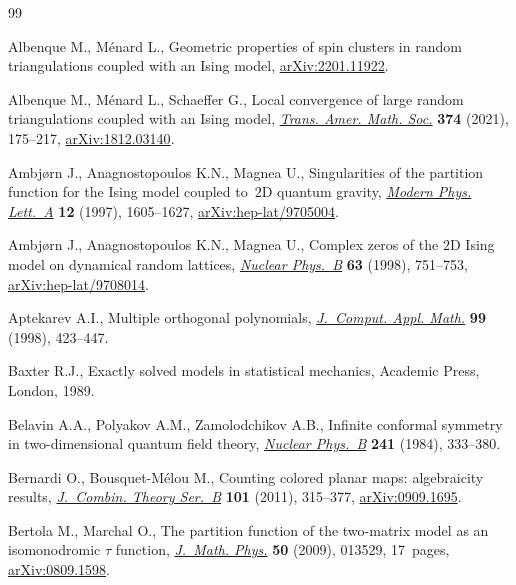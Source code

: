 \documentclass[pdftex]{sigma}
\numberwithin{equation}{section}
\begin{document}
\begin{thebibliography}{99}
\footnotesize\itemsep=0pt

Albenque M., M\'enard L., Geometric properties of spin clusters in random
 triangulations coupled with an {I}sing model,
 \href{http://arxiv.org/abs/2201.11922}{arXiv:2201.11922}.

Albenque M., M\'enard L., Schaeffer G., Local convergence of large random
 triangulations coupled with an {I}sing model,
 \href{https://doi.org/10.1090/tran/8150}{\textit{Trans. Amer. Math. Soc.}}
 \textbf{374} (2021), 175--217,
 \href{http://arxiv.org/abs/1812.03140}{arXiv:1812.03140}.

Ambj\o{r}n J., Anagnostopoulos K.N., Magnea U., Singularities of the partition
 function for the {I}sing model coupled to~{$2$}{D} quantum gravity,
 \href{https://doi.org/10.1142/S0217732397001643}{\textit{Modern Phys.
 Lett.~A}} \textbf{12} (1997), 1605--1627,
 \href{http://arxiv.org/abs/hep-lat/9705004}{arXiv:hep-lat/9705004}.

Ambj\o{r}n J., Anagnostopoulos K.N., Magnea U., Complex zeros of the {$2$}{D}
 {I}sing model on dynamical random lattices,
 \href{https://doi.org/10.1016/S0920-5632(97)00893-1}{\textit{Nuclear
 Phys.~B}} \textbf{63} (1998), 751--753,
 \href{http://arxiv.org/abs/hep-lat/9708014}{arXiv:hep-lat/9708014}.

Aptekarev A.I., Multiple orthogonal polynomials,
 \href{https://doi.org/10.1016/S0377-0427(98)00175-7}{\textit{J.~Comput. Appl.
 Math.}} \textbf{99} (1998), 423--447.

Baxter R.J., Exactly solved models in statistical mechanics, Academic Press,
 London, 1989.

Belavin A.A., Polyakov A.M., Zamolodchikov A.B., Infinite conformal symmetry in
 two-dimensional quantum field theory,
 \href{https://doi.org/10.1016/0550-3213(84)90052-X}{\textit{Nuclear Phys.~B}}
 \textbf{241} (1984), 333--380.

Bernardi O., Bousquet-M\'elou M., Counting colored planar maps: algebraicity
 results, \href{https://doi.org/10.1016/j.jctb.2011.02.003}{\textit{J.~Combin.
 Theory Ser.~B}} \textbf{101} (2011), 315--377,
 \href{http://arxiv.org/abs/0909.1695}{arXiv:0909.1695}.

Bertola M., Marchal O., The partition function of the two-matrix model as an
 isomonodromic {$\tau$} function,
 \href{https://doi.org/10.1063/1.3054865}{\textit{J.~Math. Phys.}} \textbf{50}
 (2009), 013529, 17~pages,
 \href{http://arxiv.org/abs/0809.1598}{arXiv:0809.1598}.


\end{thebibliography}
\end{document}
